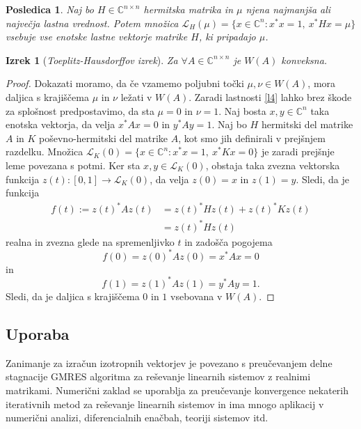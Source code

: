 \documentclass[12pt,a4paper]{amsart}
\theoremstyle{definition}
\theoremstyle{plain}
\newtheorem{izrek}[definicija]{Izrek}
\newtheorem{posledica}[definicija]{Posledica}
\newcommand{\LH}{\mathcal{L}}
\newcommand{\C}{\mathbb C}
\begin{document}
\begin{posledica}\cite{zaloga}
Naj bo $H\in \C^{n\times n}$ hermitska matrika in $\mu$ njena najmanjša ali največja lastna vrednost. Potem množica $\LH_{H}(\mu)=\{x\in \C^n\! : x^\ast x=1,\ x^\ast Hx=\mu \}$ vsebuje vse enotske lastne vektorje matrike $H$, ki pripadajo $\mu$.
\end{posledica}

\begin{izrek}[\emph{Toeplitz-Hausdorffov izrek}]\cite{zaloga}
Za $\forall A\in \C^{n\times n}$ je $W(A)$ konveksna.
\end{izrek}

\begin{proof}
Dokazati moramo, da če vzamemo poljubni točki $\mu, \nu \in W(A)$,  mora daljica s krajiščema $\mu$ in $\nu$ ležati v $W(A)$. Zaradi lastnosti \ref{l4} lahko brez škode za splošnost predpostavimo, da sta $\mu=0$ in $\nu=1$. Naj bosta $x,y\in \C^n$ taka enotska vektorja, da velja $x^\ast Ax=0$ in $y^\ast Ay=1$. 
Naj bo $H$ hermitski del matrike $A$ in $K$ poševno-hermitski del matrike $A$, kot smo jih definirali v prejšnjem razdelku. Množica $\LH_{K}(0) =\{x\in \C^n\! : x^\ast x=1,\ x^\ast Kx=0\}$ je zaradi prejšnje leme povezana s potmi. Ker sta $x,y\in \LH_{K}(0)$, obstaja taka zvezna vektorska funkcija $z(t): [0,1] \rightarrow \LH_{K}(0)$, da velja $z(0)=x$ in $z(1)=y$.  Sledi, da je funkcija 
\begin{align*}
f(t):= z(t)^\ast A z(t) &= z(t)^\ast Hz(t) +z(t)^\ast K z(t) \\
 &= z(t)^\ast Hz(t)
\end{align*}
realna in zvezna glede na spremenljivko $t$ in zadošča pogojema $$f(0)= z(0)^\ast Az(0)=x^\ast Ax=0$$ in $$f(1)= z(1)^\ast Az(1)=y^\ast Ay=1.$$ Sledi, da je daljica s krajiščema $0$ in $1$ vsebovana v $W(A)$.
\end{proof}

\subsection{Uporaba}
Zanimanje za izračun izotropnih vektorjev je povezano s pre\-u\-če\-va\-njem delne stagnacije GMRES algoritma za reševanje linearnih sistemov z realnimi matrikami. Numerični zaklad se uporablja za preučevanje konvergence nekaterih iterativnih metod za reševanje linearnih sistemov in ima mnogo aplikacij v numerični analizi, diferencialnih enačbah, teoriji sistemov itd.
\end{document}
